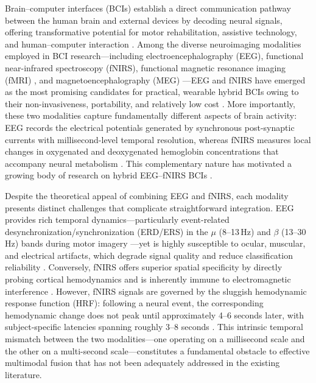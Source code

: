 \documentclass[preprint,12pt,authoryear]{elsarticle}
\begin{document}
Brain--computer interfaces (BCIs) establish a direct communication pathway between the human brain and external devices by decoding neural signals, offering transformative potential for motor rehabilitation, assistive technology, and human--computer interaction \citep{wolpaw2002brain, ramadan2017bci}. Among the diverse neuroimaging modalities employed in BCI research---including electroencephalography (EEG), functional near-infrared spectroscopy (fNIRS), functional magnetic resonance imaging (fMRI) \citep{du2022fmri}, and magnetoencephalography (MEG) \citep{li2023meg}---EEG and fNIRS have emerged as the most promising candidates for practical, wearable hybrid BCIs owing to their non-invasiveness, portability, and relatively low cost \citep{naseer2015fnirs, ahn2017multimodal}. More importantly, these two modalities capture fundamentally different aspects of brain activity: EEG records the electrical potentials generated by synchronous post-synaptic currents with millisecond-level temporal resolution, whereas fNIRS measures local changes in oxygenated and deoxygenated hemoglobin concentrations that accompany neural metabolism \citep{jobsis1977noninvasive}. This complementary nature has motivated a growing body of research on hybrid EEG--fNIRS BCIs \citep{ahn2017multimodal, aghajani2020measuring}.

Despite the theoretical appeal of combining EEG and fNIRS, each modality presents distinct challenges that complicate straightforward integration. EEG provides rich temporal dynamics---particularly event-related desynchronization/synchronization (ERD/ERS) in the $\mu$ (8--13\,Hz) and $\beta$ (13--30\,Hz) bands during motor imagery \citep{buzsaki2004large}---yet is highly susceptible to ocular, muscular, and electrical artifacts, which degrade signal quality and reduce classification reliability \citep{minguillon2017artifact}. Conversely, fNIRS offers superior spatial specificity by directly probing cortical hemodynamics and is inherently immune to electromagnetic interference \citep{scholkmann2014general}. However, fNIRS signals are governed by the sluggish hemodynamic response function (HRF): following a neural event, the corresponding hemodynamic change does not peak until approximately 4--6 seconds later, with subject-specific latencies spanning roughly 3--8 seconds \citep{buxton1998dynamics, lindquist2009modeling}. This intrinsic temporal mismatch between the two modalities---one operating on a millisecond scale and the other on a multi-second scale---constitutes a fundamental obstacle to effective multimodal fusion that has not been adequately addressed in the existing literature.
\end{document}
